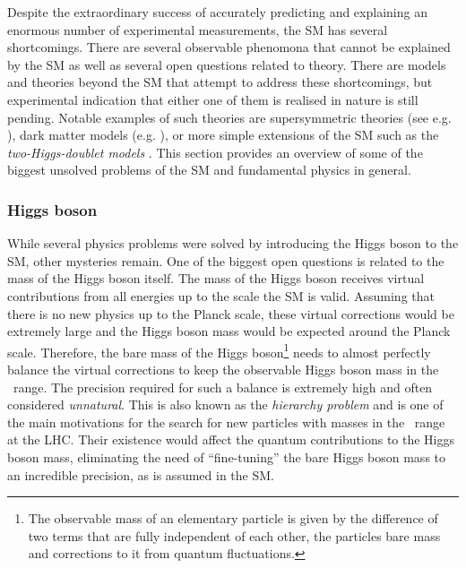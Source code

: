 Despite the extraordinary success of accurately predicting and explaining an enormous number of experimental measurements, the SM has several shortcomings.
There are several observable phenomona that cannot be explained by the SM as well as several open questions related to theory. 
There are models and theories beyond the SM that attempt to address these shortcomings, but experimental indication that either one of them is realised in nature is still pending.
Notable examples of such theories are supersymmetric theories (see e.g. ), dark matter models (e.g. ), or more simple extensions of the SM such as the \emph{two-Higgs-doublet models} \cite{Branco_2012}.
This section provides an overview of some of the biggest unsolved problems of the SM and fundamental physics in general.




\subsubsection{Higgs boson}
While several physics problems were solved by introducing the Higgs boson to the SM, other mysteries remain. 
One of the biggest open questions is related to the mass of the Higgs boson itself. 
The mass of the Higgs boson receives virtual contributions from all energies up to the scale the SM is valid. 
Assuming that there is no new physics up to the Planck scale, these virtual corrections would be extremely large and the Higgs boson mass would be expected around the Planck scale. 
Therefore, the bare mass of the Higgs boson\footnote{The observable mass of an elementary particle is given by the difference of two terms that are fully independent of each other, the particles bare mass and corrections to it from quantum fluctuations.}
needs to almost perfectly balance the virtual corrections to keep the observable Higgs boson mass in the \GeV\ range. The precision required for such a balance is extremely high and often considered \emph{unnatural}.
This is also known as the \emph{hierarchy problem} and is one of the main motivations for the search for new particles with masses in the \TeV\ range at the LHC. 
Their existence would affect the quantum contributions to the Higgs boson mass, eliminating the need of ``fine-tuning'' the bare Higgs boson mass to an incredible precision, as is assumed in the SM. 


